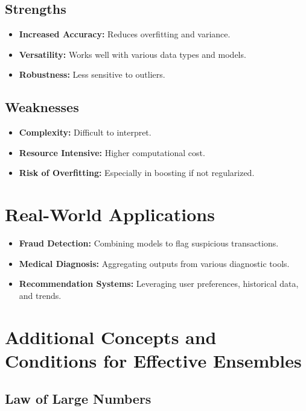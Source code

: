 \documentclass[10pt]{article}
\begin{document}
\subsection{Strengths}

\begin{itemize}
    \item \textbf{Increased Accuracy:} Reduces overfitting and variance.
    \item \textbf{Versatility:} Works well with various data types and models.
    \item \textbf{Robustness:} Less sensitive to outliers.
\end{itemize}

\subsection{Weaknesses}

\begin{itemize}
    \item \textbf{Complexity:} Difficult to interpret.
    \item \textbf{Resource Intensive:} Higher computational cost.
    \item \textbf{Risk of Overfitting:} Especially in boosting if not regularized.
\end{itemize}

\section{Real-World Applications}

\begin{itemize}
    \item \textbf{Fraud Detection:} Combining models to flag suspicious transactions.
    \item \textbf{Medical Diagnosis:} Aggregating outputs from various diagnostic tools.
    \item \textbf{Recommendation Systems:} Leveraging user preferences, historical data, and trends.
\end{itemize}

\section{Additional Concepts and Conditions for Effective Ensembles}

\subsection{Law of Large Numbers}
\end{document}
